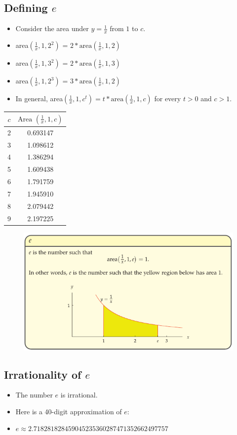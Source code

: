 \subsection{Defining \(e\)}
\begin{itemize}
  \item Consider the area under \(y = \frac{1}{x}\) from \(1\) to \(c\).
  \item area\((\frac{1}{x},1,2^{2})\) = \(2*\text{area}(\frac{1}{x},1,2)\)
  \item area\((\frac{1}{x},1,3^{2})\) = \(2*\text{area}(\frac{1}{x},1,3)\)
  \item area\((\frac{1}{x},1,2^{3})\) = \(3*\text{area}(\frac{1}{x},1,2)\)
  \item In general, area\((\frac{1}{x},1,c^{t}) = t*\text{area}(\frac{1}{x},1,c)\) for every \(t>0\) and \(c>1\).
\end{itemize}
\begin{tabular}{|c|c|}
  \hline
  \( c \) & \( \text{Area }( \frac{1}{x},1, c )\) \\ \hline
  2 & 0.693147 \\
  3 & 1.098612 \\
  4 & 1.386294 \\
  5 & 1.609438 \\
  6 & 1.791759 \\
  7 & 1.945910 \\
  8 & 2.079442 \\
  9 & 2.197225 \\
  \hline
\end{tabular}

\begin{figure}
  \includegraphics[scale=0.5]{pics/e_4.png}
\end{figure}

\subsection{Irrationality of \(e\)}
\begin{itemize}
  \item The number \(e\) is irrational.
  \item Here is a 40-digit approximation of \(e\):
  \item \(e \approx 2.718281828459045235360287471352662497757\)
\end{itemize}

